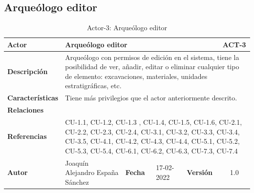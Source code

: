 \subsection{Arqueólogo editor}
    \begin{table}[H]
    \begin{center}
        \begin{adjustbox}{width=\textwidth}
        \begin{tabular}{ | l | l | l | l | c | c | } 
            \hline
            \textbf{Actor} & \multicolumn{4}{l|}{ Arqueólogo editor} & \cellcolor{gray!50} \textbf{ACT-3}\\
            \hline
            \textbf{Descripción} & \multicolumn{5}{p{0.5\linewidth}|}{Arqueólogo con permisos
            de edición en el sistema, tiene la posibilidad de ver, añadir, editar o eliminar
            cualquier tipo de elemento: excavaciones, materiales, unidades estratigráficas, etc.} \\
            \hline
            \textbf{Características} & \multicolumn{5}{p{0.5\linewidth}|}{Tiene más
            privilegios que el actor anteriormente descrito.} \\
            \hline
            \textbf{Relaciones} & \multicolumn{5}{p{0.5\linewidth}|}{ } \\
            \hline
            \textbf{Referencias} & \multicolumn{5}{p{0.5\linewidth}|}{CU-1.1, CU-1.2, CU-1.3 , 
            CU-1.4, CU-1.5, CU-1.6, CU-2.1, CU-2.2, CU-2.3, CU-2.4, CU-3.1, CU-3.2, CU-3.3,
            CU-3.4, CU-3.5, CU-4.1, CU-4.2, CU-4.3, CU-4.4, CU-5.1, CU-5.2, CU-5.3, CU-5.4,
            CU-6.1, CU-6.2, CU-6.3, CU-7.3, CU-7.4} \\
            \hline
            \textbf{Autor} & \multicolumn{1}{p{0.25\linewidth}|}{Joaquín Alejandro España Sánchez} & \textbf{Fecha} & 
            17-02-2022     & \textbf{Versión}                                                      & 1.0\\
            \hline
        \end{tabular}
        \end{adjustbox}
        \caption{Actor-3: Arqueólogo editor}
        \label{tab:archaeologist-editor}
    \end{center}
    \end{table}


